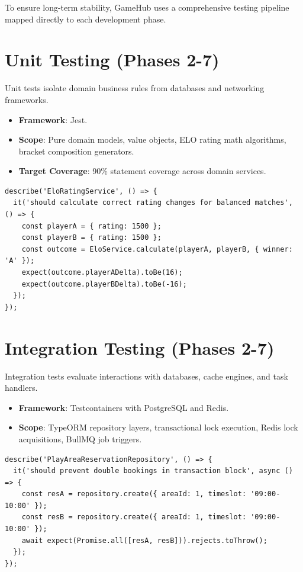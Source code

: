 \documentclass[11pt,a4paper]{report}
\begin{document}
To ensure long-term stability, GameHub uses a comprehensive testing pipeline mapped directly to each development phase.

\section{Unit Testing (Phases 2-7)}
Unit tests isolate domain business rules from databases and networking frameworks.
\begin{itemize}
    \item \textbf{Framework}: Jest.
    \item \textbf{Scope}: Pure domain models, value objects, ELO rating math algorithms, bracket composition generators.
    \item \textbf{Target Coverage}: 90\% statement coverage across domain services.
\end{itemize}
\begin{lstlisting}[caption={ELO Calculation Unit Test}]
describe('EloRatingService', () => {
  it('should calculate correct rating changes for balanced matches', () => {
    const playerA = { rating: 1500 };
    const playerB = { rating: 1500 };
    const outcome = EloService.calculate(playerA, playerB, { winner: 'A' });
    expect(outcome.playerADelta).toBe(16);
    expect(outcome.playerBDelta).toBe(-16);
  });
});
\end{lstlisting}

\section{Integration Testing (Phases 2-7)}
Integration tests evaluate interactions with databases, cache engines, and task handlers.
\begin{itemize}
    \item \textbf{Framework}: Testcontainers with PostgreSQL and Redis.
    \item \textbf{Scope}: TypeORM repository layers, transactional lock execution, Redis lock acquisitions, BullMQ job triggers.
\end{itemize}
\begin{lstlisting}[caption={PlayAreaReservation Integration Test}]
describe('PlayAreaReservationRepository', () => {
  it('should prevent double bookings in transaction block', async () => {
    const resA = repository.create({ areaId: 1, timeslot: '09:00-10:00' });
    const resB = repository.create({ areaId: 1, timeslot: '09:00-10:00' });
    await expect(Promise.all([resA, resB])).rejects.toThrow();
  });
});
\end{lstlisting}
\end{document}
